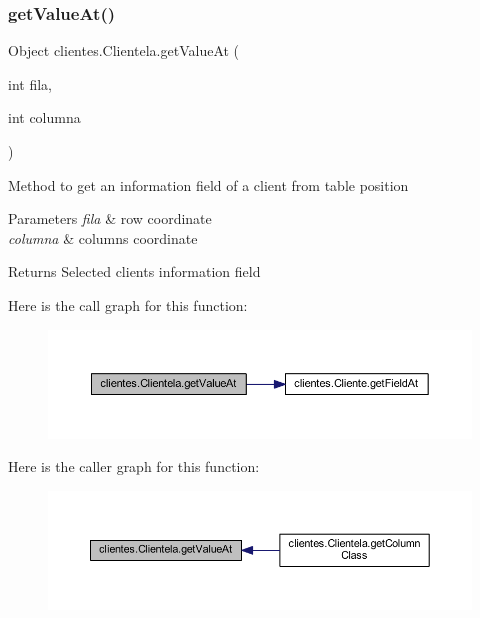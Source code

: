 \subsubsection{\texorpdfstring{get\+Value\+At()}{getValueAt()}}
{\footnotesize\ttfamily Object clientes.\+Clientela.\+get\+Value\+At (\begin{DoxyParamCaption}\item[{int}]{fila,  }\item[{int}]{columna }\end{DoxyParamCaption})}

Method to get an information field of a client from table position 
\begin{DoxyParams}{Parameters}
{\em fila} & row coordinate \\
\hline
{\em columna} & columns coordinate \\
\hline
\end{DoxyParams}
\begin{DoxyReturn}{Returns}
Selected client\textquotesingle{}s information field 
\end{DoxyReturn}
Here is the call graph for this function\+:\nopagebreak
\begin{figure}[H]
\begin{center}
\leavevmode
\includegraphics[width=350pt]{classclientes_1_1_clientela_a58c7e701ceb7a1eb87d4aa996fc1e546_cgraph}
\end{center}
\end{figure}
Here is the caller graph for this function\+:\nopagebreak
\begin{figure}[H]
\begin{center}
\leavevmode
\includegraphics[width=350pt]{classclientes_1_1_clientela_a58c7e701ceb7a1eb87d4aa996fc1e546_icgraph}
\end{center}
\end{figure}
\mbox{\label{classclientes_1_1_clientela_a99c3c767c734c205696aaf32131e0119}} 
